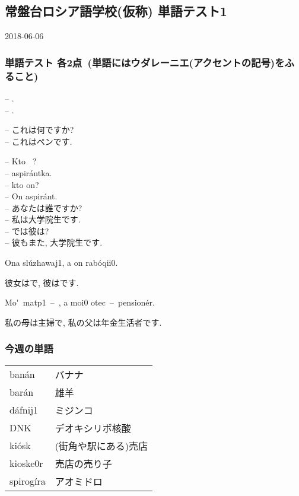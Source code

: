 \documentclass[11pt]{jsarticle}
\begin{document}
\subsection*{常盤台ロシア語学校(仮称) 単語テスト1}
\begin{flushright}
  2018-06-06
\end{flushright}
\subsubsection*{単語テスト 各2点\ (単語にはウダレーニエ(アクセントの記号)をふること)}
\begin{multicolpar}{2}
\--- \underline{\phantom{Что}} \underline{\phantom{это}}.\\
\--- \underline{\phantom{Это}} \underline{\phantom{ручка}}.

\noindent
\--- これは何ですか?\\
\--- これはペンです.
\end{multicolpar}
\begin{multicolpar}{2}
\--- Kto\ \underline{\phantom{вы}} ?\\
\--- \underline{\phantom{Я}} aspir\'antka.\\
\--- \underline{\phantom{А}} kto on?\\
\--- On \underline{\phantom{т\'ожe}} aspir\'ant.\\

\noindent
\--- あなたは誰ですか?\\
\--- 私は大学院生です.\\
\--- では彼は?\\
\--- 彼もまた, 大学院生です.
\end{multicolpar}
\begin{multicolpar}{2}
Ona sl\'u{zh}awa{j1}, a on rab\'oqi{i0}.

彼女は\underline{\phantom{勤　め　人}}で, 彼は\underline{\phantom{労　働　者}}です.
\end{multicolpar}
\begin{multicolpar}{2}
Mo\'\cyrya\ mat{p1}\ \---\ \underline{\phantom{домохоз\'яйка}}, a mo{i0} otec\ \---\ pension\'er.

私の母は主婦で, 私の父は年金生活者です.
\end{multicolpar}
\subsubsection*{今週の単語}
\begin{table}[ht]
  \begin{tabular}{ll}
    ban\'an & バナナ\\
    bar\'an & 雄羊\\
    d\'afni{j1} & ミジンコ\\
    DNK & デオキシリボ核酸\\
    ki\'osk & (街角や駅にある)売店\\
    kiosk{e0}r & 売店の売り子\\
    spirog\'ira & アオミドロ
  \end{tabular}
\end{table}
\end{document}
